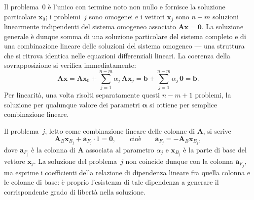 Il problema~0 \`e l'unico con termine noto non nullo e fornisce
la soluzione particolare $\bm{x}_0$; i problemi~$j$ sono omogenei
e i vettori $\bm{x}_j$ sono $n-m$ soluzioni linearmente
indipendenti del sistema omogeneo associato $\bm{A}\bm{x}=\bm{0}$.
La soluzione generale \`e dunque somma di una soluzione particolare
del sistema completo e di una combinazione lineare delle soluzioni
del sistema omogeneo --- una struttura che si ritrova identica
nelle equazioni differenziali lineari. La coerenza della
sovrapposizione si verifica immediatamente:
\begin{equation}
	\bm{A}\bm{x}
	= \bm{A}\bm{x}_0
	+ \sum_{j=1}^{n-m} \alpha_j\,\bm{A}\bm{x}_j
	= \bm{b} + \sum_{j=1}^{n-m} \alpha_j\,\bm{0}
	= \bm{b}.
\end{equation}
Per linearit\`a, una volta risolti separatamente questi $n-m+1$
problemi, la soluzione per qualunque valore dei parametri
$\bm{\alpha}$ si ottiene per semplice combinazione lineare.

\begin{oss}
	Il problema~$j$, letto come combinazione lineare delle colonne di
	$\bm{A}$, si scrive
	\begin{equation}
		\bm{A}_B\bm{x}_{B_j} + \bm{a}_{F_j}\cdot 1 = \bm{0},
		\qquad\text{cio\`e}\qquad
		\bm{a}_{F_j} = -\bm{A}_B\bm{x}_{B_j},
	\end{equation}
	dove $\bm{a}_{F_j}$ \`e la colonna di $\bm{A}$ associata al
	parametro $\alpha_j$ e $\bm{x}_{B_j}$ \`e la parte di base del
	vettore $\bm{x}_j$. La soluzione del problema~$j$ non coincide
	dunque con la colonna $\bm{a}_{F_j}$, ma esprime i coefficienti
	della relazione di dipendenza lineare fra quella colonna e le
	colonne di base: \`e proprio l'esistenza di tale dipendenza a
	generare il corrispondente grado di libert\`a nella soluzione.
\end{oss}

